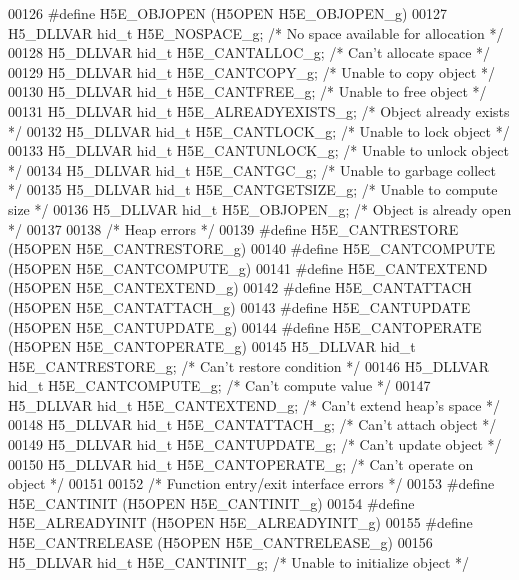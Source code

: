 \begin{DoxyCode}
00126 \textcolor{preprocessor}{#define H5E\_OBJOPEN          (H5OPEN H5E\_OBJOPEN\_g)}
00127 H5\_DLLVAR hid\_t H5E\_NOSPACE\_g;       \textcolor{comment}{/* No space available for allocation */}
00128 H5\_DLLVAR hid\_t H5E\_CANTALLOC\_g;     \textcolor{comment}{/* Can't allocate space */}
00129 H5\_DLLVAR hid\_t H5E\_CANTCOPY\_g;      \textcolor{comment}{/* Unable to copy object */}
00130 H5\_DLLVAR hid\_t H5E\_CANTFREE\_g;      \textcolor{comment}{/* Unable to free object */}
00131 H5\_DLLVAR hid\_t H5E\_ALREADYEXISTS\_g; \textcolor{comment}{/* Object already exists */}
00132 H5\_DLLVAR hid\_t H5E\_CANTLOCK\_g;      \textcolor{comment}{/* Unable to lock object */}
00133 H5\_DLLVAR hid\_t H5E\_CANTUNLOCK\_g;    \textcolor{comment}{/* Unable to unlock object */}
00134 H5\_DLLVAR hid\_t H5E\_CANTGC\_g;        \textcolor{comment}{/* Unable to garbage collect */}
00135 H5\_DLLVAR hid\_t H5E\_CANTGETSIZE\_g;   \textcolor{comment}{/* Unable to compute size */}
00136 H5\_DLLVAR hid\_t H5E\_OBJOPEN\_g;       \textcolor{comment}{/* Object is already open */}
00137 
00138 \textcolor{comment}{/* Heap errors */}
00139 \textcolor{preprocessor}{#define H5E\_CANTRESTORE      (H5OPEN H5E\_CANTRESTORE\_g)}
00140 \textcolor{preprocessor}{#define H5E\_CANTCOMPUTE      (H5OPEN H5E\_CANTCOMPUTE\_g)}
00141 \textcolor{preprocessor}{#define H5E\_CANTEXTEND       (H5OPEN H5E\_CANTEXTEND\_g)}
00142 \textcolor{preprocessor}{#define H5E\_CANTATTACH       (H5OPEN H5E\_CANTATTACH\_g)}
00143 \textcolor{preprocessor}{#define H5E\_CANTUPDATE       (H5OPEN H5E\_CANTUPDATE\_g)}
00144 \textcolor{preprocessor}{#define H5E\_CANTOPERATE      (H5OPEN H5E\_CANTOPERATE\_g)}
00145 H5\_DLLVAR hid\_t H5E\_CANTRESTORE\_g;   \textcolor{comment}{/* Can't restore condition */}
00146 H5\_DLLVAR hid\_t H5E\_CANTCOMPUTE\_g;   \textcolor{comment}{/* Can't compute value */}
00147 H5\_DLLVAR hid\_t H5E\_CANTEXTEND\_g;    \textcolor{comment}{/* Can't extend heap's space */}
00148 H5\_DLLVAR hid\_t H5E\_CANTATTACH\_g;    \textcolor{comment}{/* Can't attach object */}
00149 H5\_DLLVAR hid\_t H5E\_CANTUPDATE\_g;    \textcolor{comment}{/* Can't update object */}
00150 H5\_DLLVAR hid\_t H5E\_CANTOPERATE\_g;   \textcolor{comment}{/* Can't operate on object */}
00151 
00152 \textcolor{comment}{/* Function entry/exit interface errors */}
00153 \textcolor{preprocessor}{#define H5E\_CANTINIT         (H5OPEN H5E\_CANTINIT\_g)}
00154 \textcolor{preprocessor}{#define H5E\_ALREADYINIT      (H5OPEN H5E\_ALREADYINIT\_g)}
00155 \textcolor{preprocessor}{#define H5E\_CANTRELEASE      (H5OPEN H5E\_CANTRELEASE\_g)}
00156 H5\_DLLVAR hid\_t H5E\_CANTINIT\_g;      \textcolor{comment}{/* Unable to initialize object */}

\end{DoxyCode}
